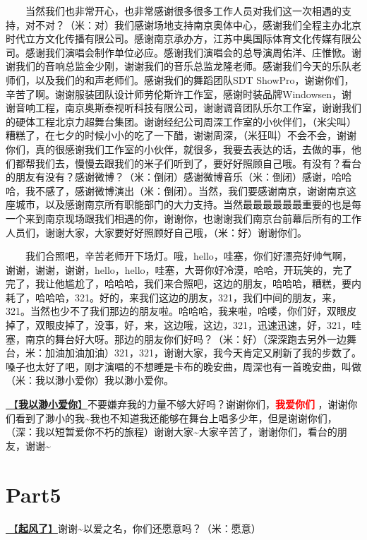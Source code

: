 \documentclass[]{ctexbook}
\begin{document}
  当然我们也非常开心，也非常感谢很多很多工作人员对我们这一次相遇的支持，对不对？（米：对）我们感谢场地支持南京奥体中心，感谢我们全程主办北京时代立方文化传播有限公司。感谢南京承办方，江苏中奥国际体育文化传媒有限公司。感谢我们演唱会制作单位必应。感谢我们演唱会的总导演周佑洋、庄惟惞。谢谢我们的音响总监金少刚，谢谢我们的音乐总监龙隆老师。感谢我们今天的乐队老师们，以及我们的和声老师们。感谢我们的舞蹈团队SDT ShowPro，谢谢你们，辛苦了啊。谢谢服装团队设计师劳伦斯许工作室，感谢时装品牌Windowsen，谢谢音响工程，南京奥斯泰视听科技有限公司，谢谢调音团队乐尔工作室，谢谢我们的硬体工程北京力超舞台集团。谢谢经纪公司周深工作室的小伙伴们，（米尖叫）糟糕了，在七夕的时候小小的吃了一下醋，谢谢周深，（米狂叫）不会不会，谢谢你们，真的很感谢我们工作室的小伙伴，就很多，我要去表达的话，去做的事，他们都帮我们去，慢慢去跟我们的米子们听到了，要好好照顾自己哦。有没有？看台的朋友有没有？感谢微博？（米：倒闭）感谢微博音乐（米：倒闭）感谢，哈哈哈，我不感了，感谢微博演出（米：倒闭）。当然，我们要感谢南京，谢谢南京这座城市，以及感谢南京所有职能部门的大力支持。当然最最最最最最重要的也是每一个来到南京现场跟我们相遇的你，谢谢你，也谢谢我们南京台前幕后所有的工作人员们，谢谢大家，大家要好好照顾好自己哦，（米：好）谢谢你们。

  我们合照吧，辛苦老师开下场灯。哦，hello，哇塞，你们好漂亮好帅气啊，谢谢，谢谢，谢谢，hello，hello，哇塞，大哥你好冷漠，哈哈，开玩笑的，完了完了，我让他尴尬了，哈哈哈，我们来合照吧，这边的朋友，哈哈哈，糟糕，要内耗了，哈哈哈，321。好的，来我们这边的朋友，321，我们中间的朋友，来，321。当然也少不了我们那边的朋友啦。哈哈哈，我来啦，哈喽，你们好，双眼皮掉了，双眼皮掉了，没事，好，来，这边哦，这边，321，迅速迅速，好，321，哇塞，南京的舞台好大呀。那边的朋友你们好吗？（米：好）（深深跑去另外一边舞台，米：加油加油加油）321，321，谢谢大家，我今天肯定又刷新了我的步数了。嗓子也太好了吧，刚才演唱的不想睡是卡布的晚安曲，周深也有一首晚安曲，叫做（米：我以渺小爱你）我以渺小爱你。

\hyperref[loving-you-in-my-humble-way]{🎵【\textbf{我以渺小爱你}】}不要嫌弃我的力量不够大好吗？谢谢你们，\textbf{\textcolor{red}{我爱你们} }，谢谢你们看到了渺小的我\textasciitilde 我也不知道我还能够在舞台上唱多少年，但是谢谢你们，（深：我以短暂爱你不朽的旅程）谢谢大家\textasciitilde 大家辛苦了，谢谢你们，看台的朋友，谢谢\textasciitilde{}

\section{Part5}\label{nanjing-20240810-part5}

\hyperref[the-wind-rises]{🎵【\textbf{起风了}】}谢谢\textasciitilde 以爱之名，你们还愿意吗？（米：愿意）
\end{document}
